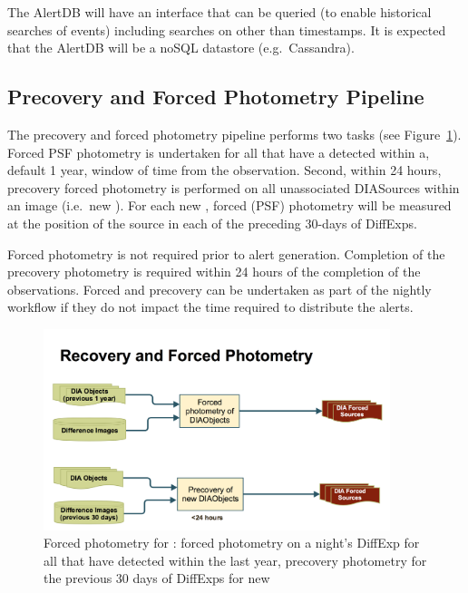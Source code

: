 The AlertDB will have an interface that can be queried (to enable historical searches of events) including searches on other than timestamps. It is expected that the AlertDB will be a noSQL datastore (e.g.\ Cassandra).






\clearpage

\subsection{Precovery and Forced Photometry Pipeline}

The precovery and forced photometry  pipeline performs two tasks (see Figure~\ref{fig:apForcedPrecovery}). Forced PSF photometry is undertaken for all \DIAObjects that have a detected \DIASource within a, default 1 year, window of time from the observation.  Second, within 24 hours, precovery forced photometry is performed on all unassociated DIASources within an image (i.e.\ new \DIAObjects). For each new \DIAObject, forced (PSF) photometry will be measured at the position of the source in each of the preceding  30-days of DiffExps.

Forced photometry is not required prior to alert generation. Completion of the precovery photometry is required within 24 hours of the completion of the observations. Forced and precovery can be undertaken as part of the nightly workflow if they do not impact the time required to distribute the alerts.

\begin{figure}[th]
\begin{center}
\includegraphics[width=0.9\textwidth]{figures/Forced_Precovery.png}
\caption{\label{fig:apForcedPrecovery} Forced photometry for \DIAObjects: forced photometry on a night's DiffExp for all \DIAObjects that have detected \DIASources within the last year, precovery photometry for the previous 30 days of DiffExps for new \DIAObjects}
\end{center}
\end{figure} 

